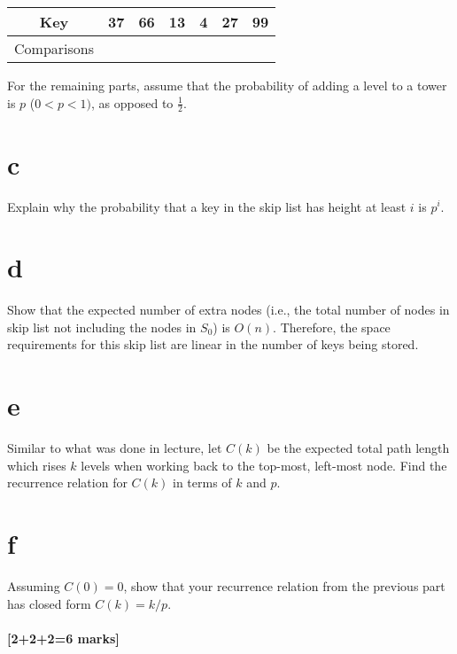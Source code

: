 \documentclass[12pt]{article}
\begin{document}
\begin{enumerate}
		\begin{center}
			\begin{tabular}{|c||c|c|c|c|c|c|} \hline
				Key &  37 &  66 &  13 &  4 & 27 & 99 \\ \hline
				Comparisons &   &   &   &   &  &  \\ \hline
			\end{tabular}
		\end{center}
		
		For the remaining parts, assume that the probability of adding a level to a tower is $p$ ($0 < p < 1)$, as opposed to $\frac{1}{2}$.
		
		\part{c} Explain why the probability that a key in the skip list has height at least $i$ is $p^i$.
		
		\part{d} Show that the expected number of extra nodes (i.e., the total number of nodes in skip list not including the nodes in $S_0$) is $O(n)$. 
		Therefore, the space requirements for this skip list are linear in the number of keys being stored.
		
		\part{e} Similar to what was done in lecture, let $C(k)$ be the expected total path length which rises $k$ levels when working back to the top-most, left-most node.  
		Find the recurrence relation for $C(k)$ in terms of $k$ and $p$. 
		
		\part{f} Assuming $C(0) = 0$, show that your recurrence relation from the previous part has closed form $C(k) = k/p$. 
		
	\end{enumerate}
	
	
	
	\subsection{[2+2+2=6 marks]}
	
\end{document}
